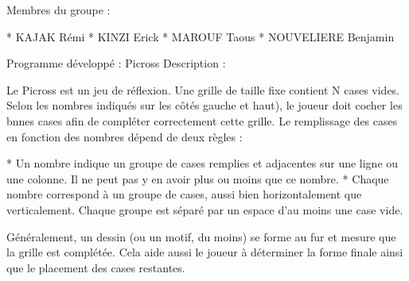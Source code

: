 Membres du groupe \+: \begin{DoxyVerb}* KAJAK Rémi
* KINZI Erick
* MAROUF Taous
* NOUVELIERE Benjamin
\end{DoxyVerb}


Programme développé \+: Picross Description \+:

Le Picross est un jeu de réflexion. Une grille de taille fixe contient N cases vides. Selon les nombres indiqués sur les côtés gauche et haut), le joueur doit cocher les bnnes cases afin de compléter correctement cette grille. Le remplissage des cases en fonction des nombres dépend de deux règles \+: \begin{DoxyVerb}* Un nombre indique un groupe de cases remplies et adjacentes sur une ligne ou une colonne. Il ne peut pas y en avoir plus ou moins que ce nombre.
* Chaque nombre correspond à un groupe de cases, aussi bien horizontalement que verticalement. Chaque groupe est séparé par un espace d'au moins une case vide.
\end{DoxyVerb}


Généralement, un dessin (ou un motif, du moins) se forme au fur et mesure que la grille est complétée. Cela aide aussi le joueur à déterminer la forme finale ainsi que le placement des cases restantes. 